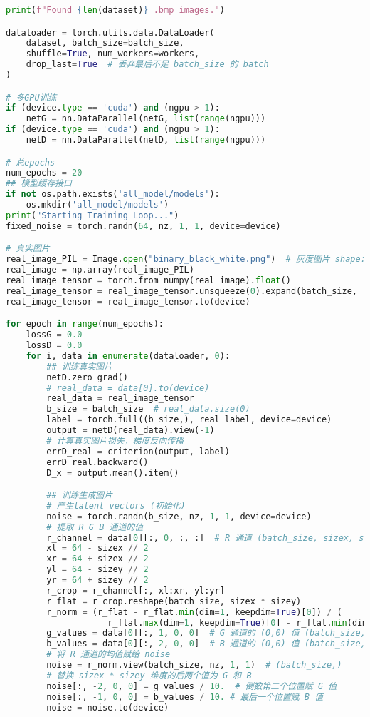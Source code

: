 \documentclass{report}
\begin{document}
\begin{lstlisting}[language=Python, caption=训练, label=code:discriminator]
print(f"Found {len(dataset)} .bmp images.")

dataloader = torch.utils.data.DataLoader(
    dataset, batch_size=batch_size,
    shuffle=True, num_workers=workers,
    drop_last=True  # 丢弃最后不足 batch_size 的 batch
)

# 多GPU训练
if (device.type == 'cuda') and (ngpu > 1):
    netG = nn.DataParallel(netG, list(range(ngpu)))
if (device.type == 'cuda') and (ngpu > 1):
    netD = nn.DataParallel(netD, list(range(ngpu)))

# 总epochs
num_epochs = 20
## 模型缓存接口
if not os.path.exists('all_model/models'):
    os.mkdir('all_model/models')
print("Starting Training Loop...")
fixed_noise = torch.randn(64, nz, 1, 1, device=device)

# 真实图片
real_image_PIL = Image.open("binary_black_white.png")  # 灰度图片 shape: (128,128)
real_image = np.array(real_image_PIL)
real_image_tensor = torch.from_numpy(real_image).float()
real_image_tensor = real_image_tensor.unsqueeze(0).expand(batch_size, -1, -1, -1)  # shape: [64, 1, 128, 128]
real_image_tensor = real_image_tensor.to(device)

for epoch in range(num_epochs):
    lossG = 0.0
    lossD = 0.0
    for i, data in enumerate(dataloader, 0):
        ## 训练真实图片
        netD.zero_grad()
        # real_data = data[0].to(device)
        real_data = real_image_tensor
        b_size = batch_size  # real_data.size(0)
        label = torch.full((b_size,), real_label, device=device)
        output = netD(real_data).view(-1)
        # 计算真实图片损失，梯度反向传播
        errD_real = criterion(output, label)
        errD_real.backward()
        D_x = output.mean().item()

        ## 训练生成图片
        # 产生latent vectors (初始化)
        noise = torch.randn(b_size, nz, 1, 1, device=device)
        # 提取 R G B 通道的值
        r_channel = data[0][:, 0, :, :]  # R 通道 (batch_size, sizex, sizey)
        xl = 64 - sizex // 2
        xr = 64 + sizex // 2
        yl = 64 - sizey // 2
        yr = 64 + sizey // 2
        r_crop = r_channel[:, xl:xr, yl:yr]
        r_flat = r_crop.reshape(batch_size, sizex * sizey)
        r_norm = (r_flat - r_flat.min(dim=1, keepdim=True)[0]) / (
                    r_flat.max(dim=1, keepdim=True)[0] - r_flat.min(dim=1, keepdim=True)[0] + 1e-8)
        g_values = data[0][:, 1, 0, 0]  # G 通道的 (0,0) 值 (batch_size,)
        b_values = data[0][:, 2, 0, 0]  # B 通道的 (0,0) 值 (batch_size,)
        # 将 R 通道的均值赋给 noise
        noise = r_norm.view(batch_size, nz, 1, 1)  # (batch_size,)
        # 替换 sizex * sizey 维度的后两个值为 G 和 B
        noise[:, -2, 0, 0] = g_values / 10.  # 倒数第二个位置赋 G 值
        noise[:, -1, 0, 0] = b_values / 10. # 最后一个位置赋 B 值
        noise = noise.to(device)


\end{lstlisting}
\end{document}
